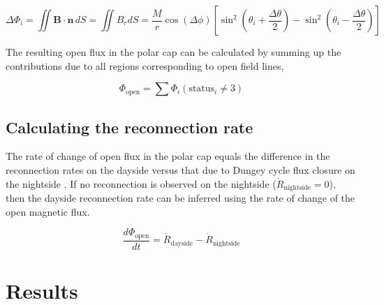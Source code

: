 \begin{equation}
    \Delta \Phi_i = \iint \mathbf{B} \cdot \mathbf{n}\, dS = \iint B_r dS = \frac{M}{r} \cos(\Delta \phi) \left[ \sin^2 \left( \theta_i + \frac{\Delta\theta}{2}\right) - \sin^2 \left(\theta_i - \frac{\Delta\theta}{2} \right)\right]
\end{equation}

The resulting open flux in the polar cap can be calculated by summing up the contributions due to all regions corresponding to open field lines,

\begin{equation}
    \Phi_\text{open} = \sum \Phi_i\left( \text{status}_i \neq 3 \right)
\end{equation}

\subsection{Calculating the reconnection rate}
The rate of change of open flux in the polar cap equals the difference in the reconnection rates on the dayside versus that due to Dungey cycle flux closure on the nightside \cite{Milan2007MagneticRates}. If no reconnection is observed on the nightside ($\dot{R}_\text{nightside}=0$), then the dayside reconnection rate can be inferred using the rate of change of the open magnetic flux. 

\begin{equation}
    \frac{d\Phi_\text{open}}{dt} = \dot{R}_\text{dayside} - \dot{R}_\text{nightside}
\end{equation}

\section{Results}

